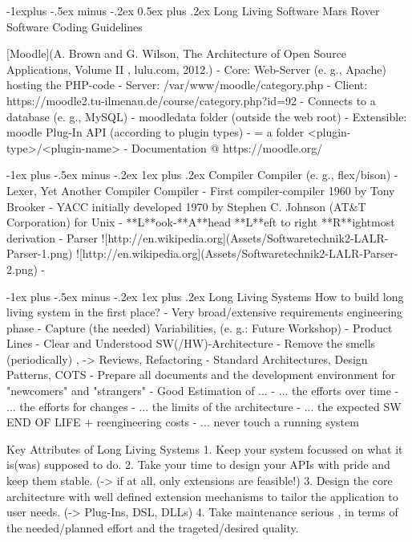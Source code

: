 \documentclass[a4paper]{article}
\makeatletter
\renewcommand{\subsection}{\@startsection{subsection}{2}{0mm}%
                                {-1explus -.5ex minus -.2ex}%
                                {0.5ex plus .2ex}%
                                {\normalfont\normalsize\bfseries}}
\renewcommand{\subsubsection}{\@startsection{subsubsection}{3}{0mm}%
                                {-1ex plus -.5ex minus -.2ex}%
                                {1ex plus .2ex}%
                                {\normalfont\small\bfseries}}
\makeatother
\begin{document}
\begin{multicols}{3}
  \subsection{Long Living Software}
  Mars Rover Software Coding Guidelines
  
  [Moodle](A. Brown and G. Wilson, The Architecture of Open Source Applications, Volume II , lulu.com, 2012.)
  - Core: Web-Server (e. g., Apache) hosting the PHP-code
      - Server: /var/www/moodle/category.php
      - Client: https://moodle2.tu-ilmenau.de/course/category.php?id=92
  - Connects to a database (e. g., MySQL)
  - moodledata folder (outside the web root)
  - Extensible: moodle Plug-In API (according to plugin types)
      - = a folder <plugin-type>/<plugin-name>
  - Documentation @ https://moodle.org/
  
  \subsubsection{Compiler Compiler }
  (e. g., flex/bison)
  - Lexer, Yet Another Compiler Compiler
  - First compiler-compiler 1960 by Tony Brooker
  - YACC initially developed 1970 by Stephen C. Johnson (AT\&T Corporation) for Unix
  - **L**ook-**A**head **L**eft to right **R**ightmost derivation - Parser
      ![http://en.wikipedia.org](Assets/Softwaretechnik2-LALR-Parser-1.png)
      ![http://en.wikipedia.org](Assets/Softwaretechnik2-LALR-Parser-2.png)
  - %
  
  
  \subsubsection{Long Living Systems}
  How to build long living system in the first place?
  - Very broad/extensive requirements engineering phase
  - Capture (the needed) Variabilities, (e. g.: Future Workshop)
      - Product Lines
  - Clear and Understood SW(/HW)-Architecture
      - Remove the smells (periodically) , -> Reviews, Refactoring
      - Standard Architectures, Design Patterns, COTS
  - Prepare all documents and the development environment for "newcomers" and "strangers"
  - Good Estimation of ...
      - ... the efforts over time
      - ... the efforts for changes
      - ... the limits of the architecture
      - ... the expected SW END OF LIFE + reengineering costs
  - ... never touch a running system
  
  Key Attributes of Long Living Systems
  1. Keep your system focussed on what it is(was) supposed to do.
  2. Take your time to design your APIs with pride and keep them stable. (-> if at all, only extensions are feasible!)
  3. Design the core architecture with well defined extension mechanisms to tailor the application to user needs. (-> Plug-Ins, DSL, DLLs)
  4. Take maintenance serious , in terms of the needed/planned effort and the trageted/desired quality.
  

\end{multicols}
\end{document}
